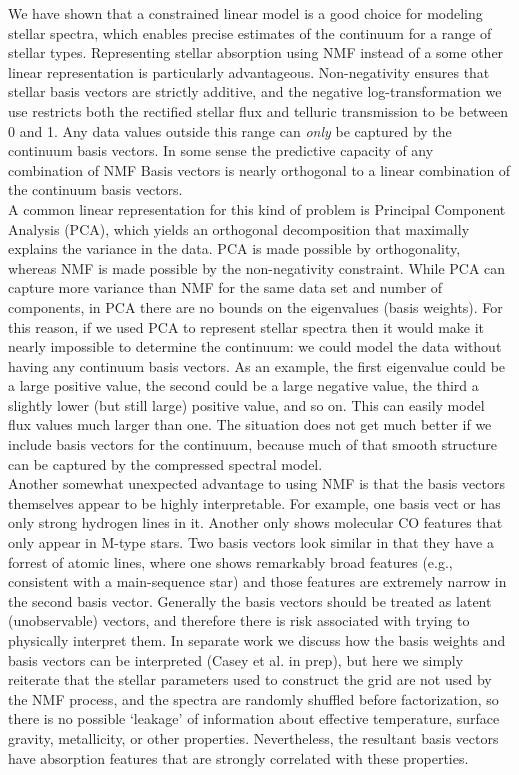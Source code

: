 \documentclass[modern]{aastex631}
\begin{document}
We have shown that a constrained linear model is a good choice for modeling stellar spectra, which enables precise estimates of the continuum for a range of stellar types. Representing stellar absorption using NMF instead of a some other linear representation is particularly advantageous. Non-negativity ensures that stellar basis vectors are strictly additive, and the negative log-transformation we use restricts both the rectified stellar flux and telluric transmission to be between 0 and 1. Any data values outside this range can \emph{only} be captured by the continuum basis vectors. In some sense the predictive capacity of any combination of NMF Basis vectors is nearly orthogonal to a linear combination of the continuum basis vectors.\\

A common linear representation for this kind of problem is Principal Component Analysis (PCA), which yields an orthogonal decomposition that maximally explains the variance in the data. PCA is made possible by orthogonality, whereas NMF is made possible by the non-negativity constraint. While PCA can capture more variance than NMF for the same data set and number of components, in PCA there are no bounds on the eigenvalues (basis weights). For this reason, if we used PCA to represent stellar spectra then it would make it nearly impossible to determine the continuum: we could model the data without having any continuum basis vectors. As an example, the first eigenvalue could be a large positive value, the second could be a large negative value, the third a slightly lower (but still large) positive value, and so on. This can easily model flux values much larger than one. The situation does not get much better if we include basis vectors for the continuum, because much of that smooth structure can be captured by the compressed spectral model.\\

Another somewhat unexpected advantage to using NMF is that the basis vectors themselves appear to be highly interpretable. For example, one basis vect or has only strong hydrogen lines in it. Another only shows molecular CO features that only appear in M-type stars. Two basis vectors look similar in that they have a forrest of atomic lines, where one shows remarkably broad features (e.g., consistent with a main-sequence star) and those features are extremely narrow in the second basis vector. Generally the basis vectors should be treated as latent (unobservable) vectors, and therefore there is risk associated with trying to physically interpret them. In separate work we discuss how the basis weights and basis vectors can be interpreted (Casey et al. in prep), but here we simply reiterate that the stellar parameters used to construct the grid are not used by the NMF process, and the spectra are randomly shuffled before factorization, so there is no possible `leakage' of information about effective temperature, surface gravity, metallicity, or other properties. Nevertheless, the resultant basis vectors have absorption features that are strongly correlated with these properties. \\
\end{document}
